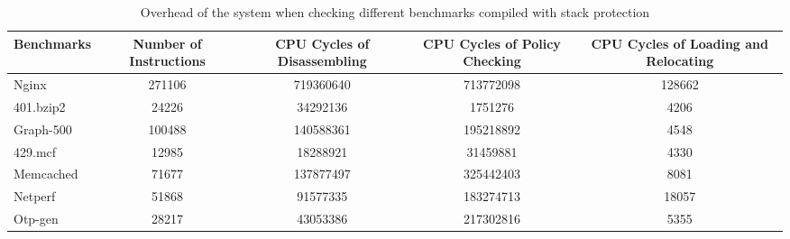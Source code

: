 \begin{table*}[t]
\centering
\footnotesize{
\begin{tabular}{|l|c|c|c|c|}
\hline
 \bf Benchmarks                    & \bf Number of Instructions & \bf CPU Cycles of  Disassembling & \bf CPU Cycles of Policy Checking & \bf CPU Cycles of Loading and Relocating\\
\hline
Nginx & 271106 & 719360640 & 713772098 & 128662\\
\hline
401.bzip2 & 24226 & 34292136 & 1751276 & 4206\\
\hline
Graph-500 & 100488 & 140588361 & 195218892 & 4548\\
\hline
429.mcf & 12985 & 18288921 & 31459881 & 4330\\
\hline
Memcached & 71677 & 137877497 & 325442403 & 8081\\
\hline
Netperf & 51868 & 91577335 & 183274713 & 18057\\

Otp-gen & 28217 & 43053386 & 217302816 & 5355\\
\hline
\end{tabular}
}
\caption{Overhead of the system when checking different benchmarks compiled with stack protection}{\label{table:checkingstackprotection}}
\end{table*}


